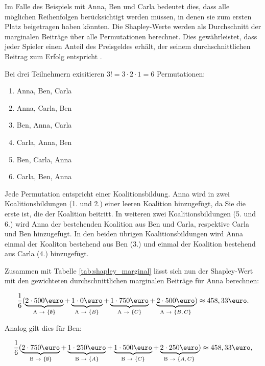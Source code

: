 Im Falle des Beispiels mit Anna, Ben und Carla bedeutet dies, dass alle möglichen Reihenfolgen 
berücksichtigt werden müssen, in denen sie zum ersten Platz beigetragen haben könnten. 
Die Shapley-Werte werden als Durchschnitt der marginalen Beiträge über alle Permutationen berechnet. 
Dies gewährleistet, dass jeder Spieler einen Anteil des Preisgeldes erhält, der seinem durchschnittlichen 
Beitrag zum Erfolg entspricht \cite[S. 20]{Molnar_2023}.

Bei drei Teilnehmern exisitieren $3! = 3 \cdot 2 \cdot 1 = 6$ Permutationen:

\begin{enumerate}[itemsep=0pt, parsep=0pt]
  \item Anna, Ben, Carla
  \item Anna, Carla, Ben
  \item Ben, Anna, Carla
  \item Carla, Anna, Ben
  \item Ben, Carla, Anna
  \item Carla, Ben, Anna
\end{enumerate}

Jede Permutation entspricht einer Koalitionsbildung. Anna wird in zwei Koalitionsbildungen (1. und 2.) einer leeren Koalition hinzugefügt, da Sie die erste ist, 
die der Koalition beitritt.
In weiteren zwei Koalitionsbildungen (5. und 6.) wird Anna der bestehenden Koalition aus Ben und Carla, respektive Carla und Ben hinzugefügt. 
In den beiden übrigen Koalitionsbildungen wird Anna einmal der Koaliton bestehend aus Ben (3.) und einmal der Koalition bestehend aus Carla (4.)
hinzugefügt. 

Zusammen mit Tabelle \ref{tab:shapley_marginal} lässt sich nun der Shapley-Wert mit den gewichteten durchschnittlichen marginalen Beiträge für Anna berechnen:

\begin{equation}
  \frac{1}{6} ( \underbrace{2 \cdot 500 \text{\euro}}_{\text{A $\rightarrow$ $\{\emptyset$\}}} + \underbrace{1 \cdot 0 \text{\euro}}_{\text{A $\rightarrow$ $\{B$\}}} + \underbrace{1 \cdot 750 \text{\euro}}_{\text{A $\rightarrow$ $\{C$\}}} + \underbrace{2 \cdot 500 \text{\euro}}_{\text{A $\rightarrow$ $\{B, C$\}}} ) \approx 458,33 \text{\euro}.  
\label{eq:marginal_anna}
\end{equation}

Analog gilt dies für Ben:

\begin{equation}
  \frac{1}{6} ( \underbrace{2 \cdot 750 \text{\euro}}_{\text{B $\rightarrow$ $\{\emptyset$\}}} + \underbrace{1 \cdot 250 \text{\euro}}_{\text{B $\rightarrow$ $\{A$\}}} + \underbrace{1 \cdot 500 \text{\euro}}_{\text{B $\rightarrow$ $\{C$\}}} + \underbrace{2 \cdot 250 \text{\euro}}_{\text{B $\rightarrow$ $\{A, C$\}}} ) \approx 458,33 \text{\euro},  
  \label{eq:marginal_ben}
\end{equation}

